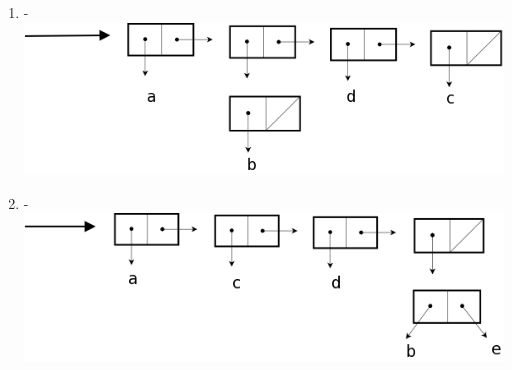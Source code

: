 \documentclass[a4paper, 11pt]{article}
\begin{document}
\begin{enumerate}
    \item -\\ \includegraphics[scale=0.3]{reponse5.png}
    \item -\\ \includegraphics[scale=0.3]{reponse6.png}
\end{enumerate}
%
\end{document}
